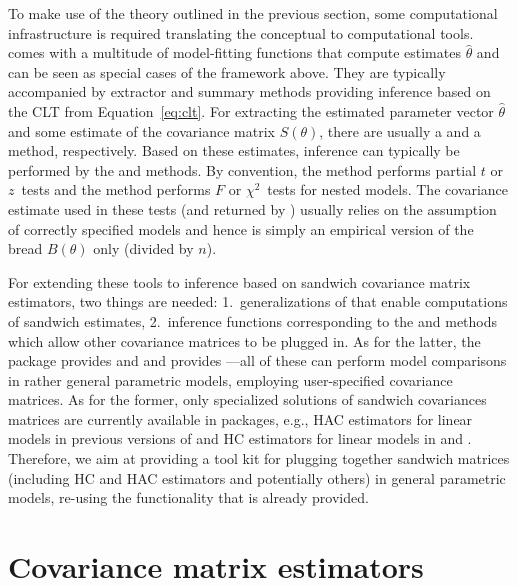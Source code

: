 \documentclass{Z}
\begin{document}
To make use of the theory outlined in the previous section, some computational infrastructure
is required translating the conceptual to computational tools.  comes with
a multitude of model-fitting functions that compute estimates $\hat \theta$ and can
be seen as special cases of the framework above. They are typically accompanied by extractor
and summary methods providing inference based on the CLT from Equation~\ref{eq:clt}. For extracting
the estimated parameter vector $\hat \theta$ and some estimate of the covariance matrix $S(\theta)$,
there are usually a  and a  method, respectively. Based on these estimates,
inference can typically be performed by the  and  methods.
By convention, the  method performs partial $t$ or $z$~tests and the
 method performs $F$ or $\chi^2$~tests for nested models. The covariance estimate
used in these tests (and returned by ) usually relies on the assumption of correctly
specified models and hence is simply an empirical version of the bread $B(\theta)$ only
(divided by $n$).

For extending these tools to inference based on sandwich covariance matrix estimators, two
things are needed: 1.~generalizations of  that enable computations of sandwich
estimates, 2.~inference functions corresponding to the  and 
methods which allow other covariance matrices to be plugged in. As for the latter, the package
 \citep{hac:Zeileis+Hothorn:2002} provides  and  and
 \citep{hac:Fox:2002} provides ---all of these can perform
model comparisons in rather general parametric models, employing user-specified covariance
matrices. As for the former, only specialized solutions of sandwich covariances matrices
are currently available in  packages, e.g., HAC estimators for linear models in
previous versions of  and HC estimators for linear models in  and
. Therefore, we aim at providing a tool kit
for plugging together sandwich matrices (including HC and HAC estimators and potentially others)
in general parametric models, re-using the functionality that is already provided.


\section{Covariance matrix estimators} \label{sec:vcov}
\end{document}
